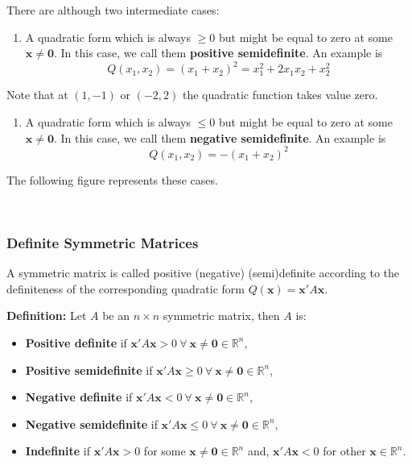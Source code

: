 \documentclass[11pt]{article}
\providecommand{\tightlist}{%
      \setlength{\itemsep}{0pt}\setlength{\parskip}{0pt}}
\begin{document}
There are although two intermediate cases:

\begin{enumerate}
\def\labelenumi{\arabic{enumi}.}
\tightlist
\item
  A quadratic form which is always \(\geq 0\) but might be equal to zero
  at some \(\mathbf{x} \neq \mathbf{0}\). In this case, we call them
  \textbf{positive semidefinite}. An example is \[
    Q(x_1, x_2) = (x_1 + x_2)^2 = x_1^2 + 2x_1x_2 + x_2^2
    \]
\end{enumerate}

Note that at \((1, -1)\) or \((-2, 2)\) the quadratic function takes
value zero.

\begin{enumerate}
\def\labelenumi{\arabic{enumi}.}
\tightlist
\item
  A quadratic form which is always \(\leq 0\) but might be equal to zero
  at some \(\mathbf{x} \neq \mathbf{0}\). In this case, we call them
  \textbf{negative semidefinite}. An example is \[
    Q(x_1, x_2) = -(x_1 + x_2)^2
    \]
\end{enumerate}

The following figure represents these cases.

    \begin{center}
    \end{center}
    { \hspace*{\fill} \\}
    
    \hypertarget{definite-symmetric-matrices}{%
\subsubsection{Definite Symmetric
Matrices}\label{definite-symmetric-matrices}}

A symmetric matrix is called positive (negative) (semi)definite
according to the definiteness of the corresponding quadratic form
\(Q(\mathbf{x}) = \mathbf{x}'A\mathbf{x}\).

\textbf{Definition:} Let \(A\) be an \(n\times n\) symmetric matrix,
then \(A\) is:

\begin{itemize}
\tightlist
\item
  \textbf{Positive definite} if
  \(\mathbf{x}'A\mathbf{x} > 0 \: \forall \: \mathbf{x} \neq \mathbf{0}\in\mathbb{R}^n\),
\item
  \textbf{Positive semidefinite} if
  \(\mathbf{x}'A\mathbf{x} \geq 0 \: \forall \: \mathbf{x} \neq \mathbf{0}\in\mathbb{R}^n\),
\item
  \textbf{Negative definite} if
  \(\mathbf{x}'A\mathbf{x} < 0 \: \forall \: \mathbf{x} \neq \mathbf{0}\in\mathbb{R}^n\),
\item
  \textbf{Negative semidefinite} if
  \(\mathbf{x}'A\mathbf{x} \leq 0 \: \forall \: \mathbf{x} \neq \mathbf{0}\in\mathbb{R}^n\),
\item
  \textbf{Indefinite} if \(\mathbf{x}'A\mathbf{x} > 0\) for some
  \(\mathbf{x} \neq \mathbf{0}\in\mathbb{R}^n\) and,
  \(\mathbf{x}'A\mathbf{x} < 0\) for other
  \(\mathbf{x}\in\mathbb{R}^n\).
\end{itemize}
\end{document}
